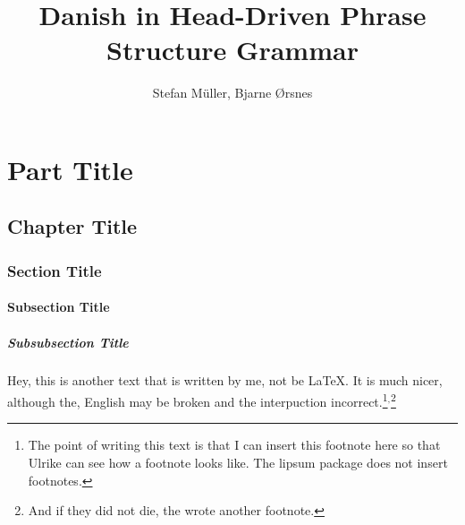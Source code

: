 \documentclass[ number=45
			   ,series=eotms
			   ,output=printondemand %
			  ]{langsci}
\title{Danish in \newlineCover Head-Driven \newlineCover\newlineSpine Phrase Structure \newlineCover Grammar  }
\author{Stefan Müller, \newlineCover Bjarne Ørsnes}
\begin{document}
               
        
                                    
                           
\maketitle                

\tableofcontents      
        
\part{Part Title}	               
\chapter{Chapter Title}
\section{Section Title}
\subsection{Subsection Title}
\subsubsection{Subsubsection Title}       
                                                   

Hey, this is another text that is written by me, not be \LaTeX{}. It is much nicer, although the,
English may be broken and the interpuction incorrect.\footnote{
  The point of writing this text is that I can insert this footnote here so that Ulrike can see how
  a footnote looks like. The lipsum package does not insert footnotes.
}$^,$\footnote{
  And if they did not die, the wrote another footnote.
}


\lipsum 
\lipsum[3-10]  

 

\newpage

\layout
                              
\end{document}
